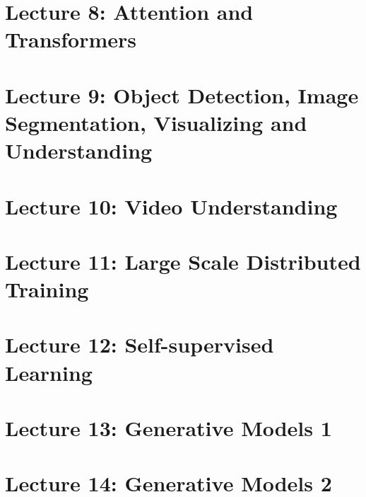 \documentclass[a4paper]{article}
\begin{document}
\section{Lecture 8: Attention and Transformers}


\section{Lecture 9: Object Detection, Image Segmentation, Visualizing and Understanding}


\section{Lecture 10: Video Understanding}


\section{Lecture 11: Large Scale Distributed Training}


\section{Lecture 12: Self-supervised Learning}


\section{Lecture 13:  Generative Models 1}


\section{Lecture 14:  Generative Models 2}

\end{document}
